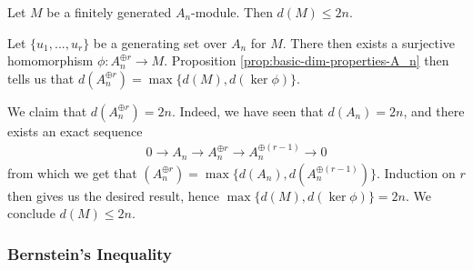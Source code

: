 \begin{cor}\label{cor:dimension-upper-bound}
	Let $M$ be a finitely generated $A_n$-module. Then $d(M) \leq 2n$.
\end{cor}
\begin{prf}
	Let $\{u_1,...,u_r\}$ be a generating set over $A_n$ for $M$. There then exists a surjective homomorphism $\phi:A_n^{\oplus r} \to M$. Proposition \ref{prop:basic-dim-properties-A_n} then tells us that $d(A_n^{\oplus r}) = \max\{d(M), d(\ker \phi)\}$. 

	We claim that $d(A_n^{\oplus r}) = 2n$. Indeed, we have seen that $d(A_n) = 2n$, and there exists an exact sequence
	\begin{align*}
		0 \to A_n \to A_n^{\oplus r} \to A_n^{\oplus (r-1)} \to 0
	\end{align*}
	from which we get that $(A_n^{\oplus r}) = \max\{d(A_n),d(A_n^{\oplus (r-1)})\}$. Induction on $r$ then gives us the desired result, hence $\max\{d(M), d(\ker \phi)\} = 2n$. We conclude $d(M) \leq 2n$.
\end{prf}

\subsubsection{Bernstein's Inequality}

